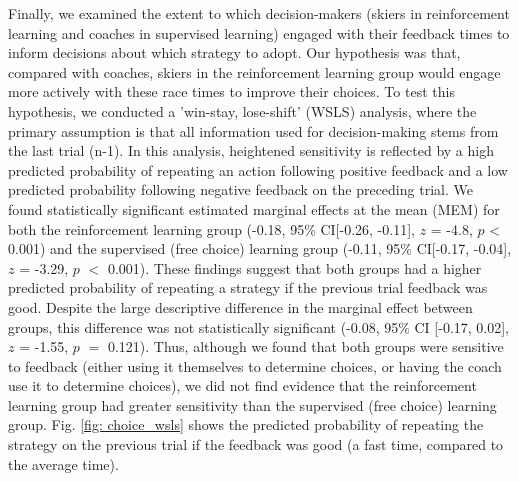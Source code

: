 \documentclass[pdflatex,sn-nature]{sn-jnl}%
\theoremstyle{thmstyleone}%
\theoremstyle{thmstyletwo}%
\theoremstyle{thmstylethree}%
\begin{document}
Finally, we examined the extent to which decision-makers (skiers in reinforcement learning and coaches in supervised learning) engaged with their feedback times to inform decisions about which strategy to adopt. Our hypothesis was that, compared with coaches, skiers in the reinforcement learning group would engage more actively with these race times to improve their choices. To test this hypothesis, we conducted a 'win-stay, lose-shift' (WSLS) analysis, where the primary assumption is that all information used for decision-making stems from the last trial (n-1)\cite{worthy_comparison_2014, iyer_probing_2020}. In this analysis, heightened sensitivity is reflected by a high predicted probability of repeating an action following positive feedback and a low predicted probability following negative feedback on the preceding trial. We found statistically significant estimated marginal effects at the mean (MEM) for both the reinforcement learning group (-0.18, 95\% CI[-0.26, -0.11], $z$ = -4.8, $p$ < 0.001) and the supervised (free choice) learning group (-0.11, 95\% CI[-0.17, -0.04], $z$ = -3.29, $p$ $<$ 0.001). These findings suggest that both groups had a higher predicted probability of repeating a strategy if the previous trial feedback was good. Despite the large descriptive difference in the marginal effect between groups, this difference was not statistically  significant (-0.08, 95\% CI [-0.17, 0.02], $z$ = -1.55, $p$ $=$ 0.121). Thus, although we found that both groups were sensitive to feedback (either using it themselves to determine choices, or having the coach use it to determine choices), we did not find evidence that the reinforcement learning group had greater sensitivity than the supervised (free choice) learning group. Fig. \ref{fig: choice_wsls} shows the predicted probability of repeating the strategy on the previous trial if the feedback was good (a fast time, compared to the average time). 
\end{document}
